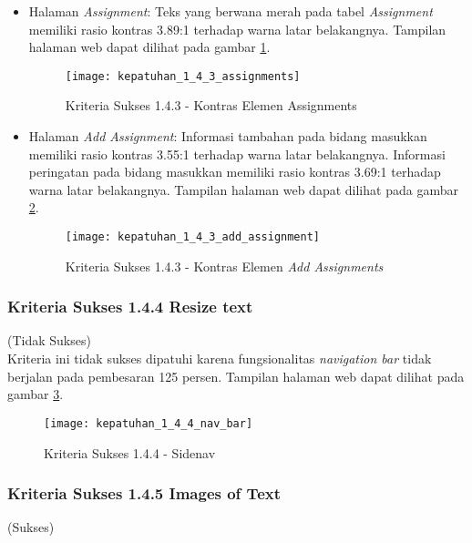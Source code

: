 \begin{itemize}
	\item Halaman \textit{Assignment}: Teks yang berwana merah pada tabel \textit{Assignment} memiliki rasio kontras 3.89:1 terhadap warna latar belakangnya. Tampilan halaman web dapat dilihat pada gambar \ref{fig:kepatuhan_1_4_3_assignments}.
	\begin{figure}[H]
		\centering  
		\texttt{[image: kepatuhan\_1\_4\_3\_assignments]}  
		\caption[Kriteria Sukses 1.4.3 - Kontras Elemen Assignments]{Kriteria Sukses 1.4.3 - Kontras Elemen Assignments} 
		\label{fig:kepatuhan_1_4_3_assignments} 
	\end{figure}
	
	\item Halaman \textit{Add Assignment}: Informasi tambahan pada bidang masukkan memiliki rasio kontras 3.55:1 terhadap warna latar belakangnya. Informasi peringatan pada bidang masukkan memiliki rasio kontras 3.69:1 terhadap warna latar belakangnya. Tampilan halaman web dapat dilihat pada gambar \ref{fig:kepatuhan_1_4_3_add_assignment}.
	\begin{figure}[H]
		\centering  
		\texttt{[image: kepatuhan\_1\_4\_3\_add\_assignment]}  
		\caption[Kriteria Sukses 1.4.3 - Kontras Elemen \textit{Add Assignments}]{Kriteria Sukses 1.4.3 - Kontras Elemen \textit{Add Assignments}} 
		\label{fig:kepatuhan_1_4_3_add_assignment} 
	\end{figure}
	
\end{itemize}

\subsubsection{Kriteria Sukses 1.4.4 Resize text}
\label{subsubsec:kepatuhan_kriteria_1.4.4}
(Tidak Sukses) \\

Kriteria ini tidak sukses dipatuhi karena fungsionalitas \textit{navigation bar} tidak berjalan pada pembesaran 125 persen. Tampilan halaman web dapat dilihat pada gambar \ref{fig:kepatuhan_1_4_4_nav_bar}.
\begin{figure}[H]
	\centering  
	\texttt{[image: kepatuhan\_1\_4\_4\_nav\_bar]}  
	\caption[Kriteria Sukses 1.4.4 - Sidenav]{Kriteria Sukses 1.4.4 - Sidenav} 
	\label{fig:kepatuhan_1_4_4_nav_bar} 
\end{figure}


\subsubsection{Kriteria Sukses 1.4.5 Images of Text}
\label{subsubsec:kepatuhan_kriteria_1.4.5}
(Sukses) \\

